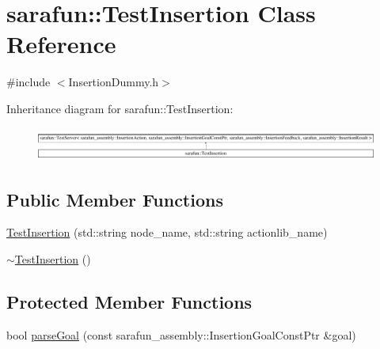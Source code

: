 \hypertarget{classsarafun_1_1TestInsertion}{\section{sarafun\-:\-:Test\-Insertion Class Reference}
\label{classsarafun_1_1TestInsertion}
}


{\ttfamily \#include $<$Insertion\-Dummy.\-h$>$}

Inheritance diagram for sarafun\-:\-:Test\-Insertion\-:\begin{figure}[H]
\begin{center}
\leavevmode
\includegraphics[height=1.113320cm]{classsarafun_1_1TestInsertion}
\end{center}
\end{figure}
\subsection*{Public Member Functions}
\begin{DoxyCompactItemize}
\item 
\hyperlink{classsarafun_1_1TestInsertion_ab178b597b83fd2f91a994f99c8b46af2}{Test\-Insertion} (std\-::string node\-\_\-name, std\-::string actionlib\-\_\-name)
\item 
\hyperlink{classsarafun_1_1TestInsertion_ab732dbdbceb3872ab0c23cf92d1afc37}{$\sim$\-Test\-Insertion} ()
\end{DoxyCompactItemize}
\subsection*{Protected Member Functions}
\begin{DoxyCompactItemize}
\item 
bool \hyperlink{classsarafun_1_1TestInsertion_a979898f82432a7b17ee4c4e75b5b4a17}{parse\-Goal} (const sarafun\-\_\-assembly\-::\-Insertion\-Goal\-Const\-Ptr \&goal)
\end{DoxyCompactItemize}


